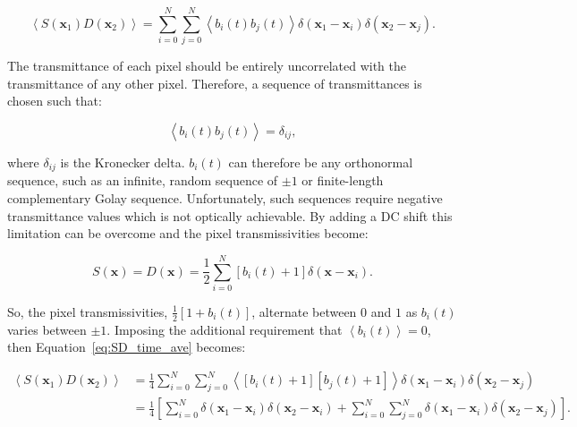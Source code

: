 \begin{equation}\label{eq:SD_time_ave}
\left\langle S\left(\textbf{x}_{1}\right) D\left(\textbf{x}_{2}\right)\right\rangle = \sum_{i=0}^{N}\sum_{j=0}^{N} \left\langle b_{i}\left(t\right) b_{j}\left(t\right)\right\rangle \delta\left(\textbf{x}_{1} - \textbf{x}_{i}\right) \delta\left(\textbf{x}_{2} - \textbf{x}_{j}\right).
\end{equation}

The transmittance of each pixel should be entirely 
uncorrelated with the transmittance of any other pixel. 
Therefore, a sequence of transmittances is chosen such that:

\begin{equation}\label{eq:pixel_uncorrelation}
\left\langle b_{i}\left(t\right) b_{j}\left(t\right)\right\rangle = \delta_{ij},
\end{equation}

where $\delta_{ij}$ is the Kronecker delta. $b_{i}\left(t\right)$ 
can therefore be any orthonormal sequence, such as an infinite, 
random sequence of $\pm1$ or finite-length complementary Golay 
sequence\cite{golay1949multi}. Unfortunately, such sequences 
require negative transmittance values which is not optically 
achievable. By adding a DC shift this limitation can be overcome 
and the pixel transmissivities become:

\begin{equation}\label{eq:detector_aperture_time_DC}
S\left(\textbf{x}\right) = D\left(\textbf{x}\right) = \frac{1}{2} \sum_{i=0}^{N} \left[b_{i}\left(t\right) + 1\right]\delta\left(\textbf{x} - \textbf{x}_{i}\right).
\end{equation} 

So, the pixel transmissivities, $\frac{1}{2}\left[1 + b_{i}\left(t\right)\right]$, alternate between $0$ and $1$ as $b_{i}\left(t\right)$ 
varies between $\pm1$. Imposing the additional requirement that 
$\left\langle b_{i}\left(t\right) \right\rangle = 0$, then 
Equation~\ref{eq:SD_time_ave} becomes:

\begin{equation}\label{eq:SD_time_ave_DC}
\begin{split}
\left\langle S\left(\textbf{x}_{1}\right) D\left(\textbf{x}_{2}\right)\right\rangle &= \frac{1}{4} \sum_{i=0}^{N}\sum_{j=0}^{N} \left\langle \left[b_{i}\left(t\right) + 1\right] \left[b_{j}\left(t\right) + 1\right] \right\rangle \delta\left(\textbf{x}_{1} - \textbf{x}_{i}\right) \delta\left(\textbf{x}_{2} - \textbf{x}_{j}\right)\\
&= \frac{1}{4} \left[\sum_{i=0}^{N} \delta\left(\textbf{x}_{1} - \textbf{x}_{i}\right) \delta\left(\textbf{x}_{2} - \textbf{x}_{i}\right) + \sum_{i=0}^{N}\sum_{j=0}^{N} \delta\left(\textbf{x}_{1} - \textbf{x}_{i}\right) \delta\left(\textbf{x}_{2} - \textbf{x}_{j}\right)\right].\\
\end{split}
\end{equation}

